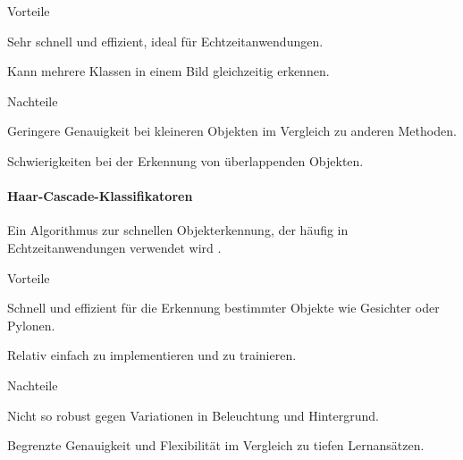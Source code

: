 \documentclass[../main.tex]{subfiles}
\begin{document}
\begin{minipage}[t]{0.48\textwidth}
\begin{items}
  \item [Vorteile]
  \item Sehr schnell und effizient, ideal für Echtzeitanwendungen.
  \item Kann mehrere Klassen in einem Bild gleichzeitig erkennen.
\end{items}
\end{minipage}
\hfill
\begin{minipage}[t]{0.48\textwidth}
\begin{items}
  \item [Nachteile]
  \item Geringere Genauigkeit bei kleineren Objekten im Vergleich zu anderen Methoden.
  \item Schwierigkeiten bei der Erkennung von überlappenden Objekten.
\end{items}
\end{minipage}

\paragraph{Haar-Cascade-Klassifikatoren}

Ein Algorithmus zur schnellen Objekterkennung, der häufig in Echtzeitanwendungen verwendet wird \cite{haar-cascade}.

\begin{minipage}[t]{0.48\textwidth}
\begin{items}
  \item [Vorteile]
  \item Schnell und effizient für die Erkennung bestimmter Objekte wie Gesichter oder Pylonen.
  \item Relativ einfach zu implementieren und zu trainieren.
\end{items}
\end{minipage}
\hfill
\begin{minipage}[t]{0.48\textwidth}
\begin{items}
  \item [Nachteile]
  \item Nicht so robust gegen Variationen in Beleuchtung und Hintergrund.
  \item Begrenzte Genauigkeit und Flexibilität im Vergleich zu tiefen Lernansätzen.
\end{items}
\end{minipage}
\end{document}
